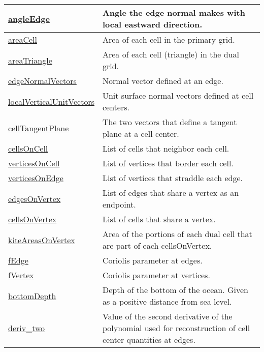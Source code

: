 {\begin{center}
\begin{longtable}{| p{2.0in} | p{4.0in} |}
	\hline
	\hyperref[subsec:var_sec_mesh_angleEdge]{angleEdge} & Angle the edge normal makes with local eastward direction. \\
	\hline
	\hyperref[subsec:var_sec_mesh_areaCell]{areaCell} & Area of each cell in the primary grid. \\
	\hline
	\hyperref[subsec:var_sec_mesh_areaTriangle]{areaTriangle} & Area of each cell (triangle) in the dual grid. \\
	\hline
	\hyperref[subsec:var_sec_mesh_edgeNormalVectors]{edgeNormalVectors} & Normal vector defined at an edge. \\
	\hline
	\hyperref[subsec:var_sec_mesh_localVerticalUnitVectors]{localVerticalUnitVectors} & Unit surface normal vectors defined at cell centers. \\
	\hline
	\hyperref[subsec:var_sec_mesh_cellTangentPlane]{cellTangentPlane} & The two vectors that define a tangent plane at a cell center. \\
	\hline
	\hyperref[subsec:var_sec_mesh_cellsOnCell]{cellsOnCell} & List of cells that neighbor each cell. \\
	\hline
	\hyperref[subsec:var_sec_mesh_verticesOnCell]{verticesOnCell} & List of vertices that border each cell. \\
	\hline
	\hyperref[subsec:var_sec_mesh_verticesOnEdge]{verticesOnEdge} & List of vertices that straddle each edge. \\
	\hline
	\hyperref[subsec:var_sec_mesh_edgesOnVertex]{edgesOnVertex} & List of edges that share a vertex as an endpoint. \\
	\hline
	\hyperref[subsec:var_sec_mesh_cellsOnVertex]{cellsOnVertex} & List of cells that share a vertex. \\
	\hline
	\hyperref[subsec:var_sec_mesh_kiteAreasOnVertex]{kiteAreasOnVertex} & Area of the portions of each dual cell that are part of each cellsOnVertex. \\
	\hline
	\hyperref[subsec:var_sec_mesh_fEdge]{fEdge} & Coriolis parameter at edges. \\
	\hline
	\hyperref[subsec:var_sec_mesh_fVertex]{fVertex} & Coriolis parameter at vertices. \\
	\hline
	\hyperref[subsec:var_sec_mesh_bottomDepth]{bottomDepth} & Depth of the bottom of the ocean. Given as a positive distance from sea level. \\
	\hline
	\hyperref[subsec:var_sec_mesh_deriv_two]{deriv\_two} & Value of the second derivative of the polynomial used for reconstruction of cell center quantities at edges. \\

\end{longtable}
\end{center}}
